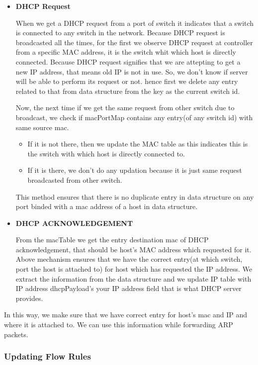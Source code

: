 \documentclass{article}
\begin{document}
\begin{itemize}
	\item \textbf{DHCP Request}

		When we get a DHCP request from a port of switch it indicates that a switch is connected to any switch in the network.
		Because DHCP request is broadcasted all the times, for the first we observe DHCP request at controller from a specific MAC address, it is the switch whit which host is directly connected. 
		Because DHCP request signifies that we are attepting to get a new IP address, that means old IP is not in use. 
		So, we don't know if server will be able to perform its request or not. hence first we delete any entry related to that from data structure from the key as the current switch id.

		Now, the next time if we get the same request from other switch due to broadcast, we check if macPortMap contains any entry(of any switch id) with same source mac. 
		\begin{itemize}
			\item If it is not there, then we update the MAC table as this indicates this is the switch with which host is directly connected to.
			\item If it is there, we don't do any updation because it is just same request broadcasted from other switch.
		\end{itemize}

		This method ensures that there is no duplicate entry in data structure on any port binded with a mac address of a host in data structure.
	\item \textbf{DHCP ACKNOWLEDGEMENT}

		From the macTable we get the entry destination mac of DHCP acknowledgement, that should be host's MAC address which requested for it.
		Above mechanism ensures that we have the correct entry(at which switch, port the host is attached to)  for host which has requested the IP address.
		We extract the information from the data structure and we update IP table with IP address dhcpPayload's your IP address field that is what DHCP server provides.
\end{itemize}
In this way, we make sure that we have correct entry for host's mac and IP and where it is attached to. 
We can use this information while forwarding ARP packets.

\subsubsection{Updating Flow Rules}
\end{document}
